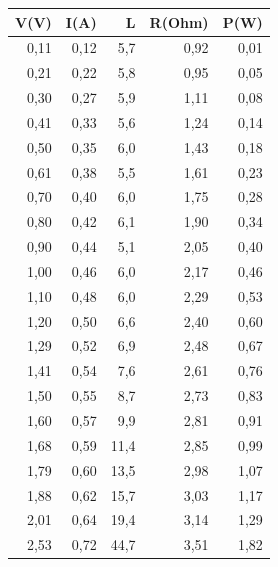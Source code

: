 \documentclass[brazilian,12pt,a4paper,final]{article}
\begin{document}
\begin{table}[htbp]
\centering
\begin{tabular}{|r|r|r|r|r|} 
\hline
V(V)    &       I(A)    &       L       &       R(Ohm)  &       P(W)    \\
\hline
0,11    &       0,12    &       5,7     &       0,92    &       0,01    \\
0,21    &       0,22    &       5,8     &       0,95    &       0,05    \\
0,30    &       0,27    &       5,9     &       1,11    &       0,08    \\
0,41    &       0,33    &       5,6     &       1,24    &       0,14    \\
0,50    &       0,35    &       6,0     &       1,43    &       0,18    \\
0,61    &       0,38    &       5,5     &       1,61    &       0,23    \\
0,70    &       0,40    &       6,0     &       1,75    &       0,28    \\
0,80    &       0,42    &       6,1     &       1,90    &       0,34    \\
0,90    &       0,44    &       5,1     &       2,05    &       0,40    \\
1,00    &       0,46    &       6,0     &       2,17    &       0,46    \\
1,10    &       0,48    &       6,0     &       2,29    &       0,53    \\
1,20    &       0,50    &       6,6     &       2,40    &       0,60    \\
1,29    &       0,52    &       6,9     &       2,48    &       0,67    \\
1,41    &       0,54    &       7,6     &       2,61    &       0,76    \\
1,50    &       0,55    &       8,7     &       2,73    &       0,83    \\
1,60    &       0,57    &       9,9     &       2,81    &       0,91    \\
1,68    &       0,59    &       11,4    &       2,85    &       0,99    \\
1,79    &       0,60    &       13,5    &       2,98    &       1,07    \\
1,88    &       0,62    &       15,7    &       3,03    &       1,17    \\
2,01    &       0,64    &       19,4    &       3,14    &       1,29    \\
2,53    &       0,72    &       44,7    &       3,51    &       1,82    \\

\end{tabular}
\end{table}
\end{document}
